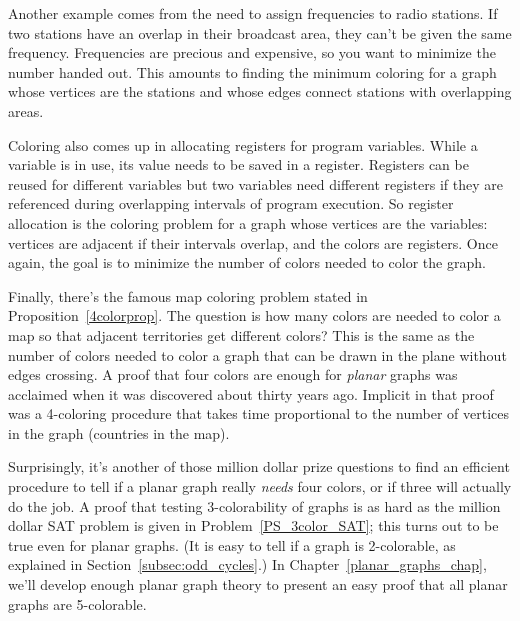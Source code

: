 Another example comes from the need to assign frequencies to radio
stations.  If two stations have an overlap in their broadcast area, they
can't be given the same frequency.  Frequencies are precious and
expensive, so you want to minimize the number handed out.  This amounts to
finding the minimum coloring for a graph whose vertices are the stations
and whose edges connect stations with overlapping areas.

Coloring also comes up in allocating registers for program variables.
While a variable is in use, its value needs to be saved in a register.
Registers can be reused for different variables but two variables need
different registers if they are referenced during overlapping
intervals of program execution.  So register allocation is the
coloring problem for a graph whose vertices are the variables:
vertices are adjacent if their intervals overlap, and the colors are
registers.  Once again, the goal is to minimize the number of colors
needed to color the graph.

Finally, there's the famous map coloring problem stated in
Proposition~\ref{4colorprop}.  The question is how many colors are
needed to color a map so that adjacent territories get different
colors?  This is the same as the number of colors needed to color a
graph that can be drawn in the plane without edges crossing.  A proof
that four colors are enough for  \emph{planar}
graphs was acclaimed when it was discovered about thirty years ago.
Implicit in that proof was a 4-coloring procedure that takes time
proportional to the number of vertices in the graph (countries in the
map).

Surprisingly, it's another of those million dollar prize questions to
find an efficient procedure to tell if a planar graph really
\emph{needs} four colors, or if three will actually do the job.  A
proof that testing 3-colorability of graphs is as hard as the million
dollar SAT problem is given in Problem~\ref{PS_3color_SAT}; this turns
out to be true even for planar graphs.  (It is easy to tell if a graph
is 2-colorable, as explained in Section~\ref{subsec:odd_cycles}.)  In
Chapter~\ref{planar_graphs_chap}, we'll develop enough planar graph
theory to present an easy proof that all planar graphs are
5-colorable.

\iffalse
Planarity is another property with important colorability consequences.
The famous 4-Color Theorem says that every planar graph is 4-colorable.
This is a hard result to prove, but we will come close in
Chapter~\ref{planar_graphs_chap} where we define planar graphs and prove
that they are 5-colorable.
\fi

